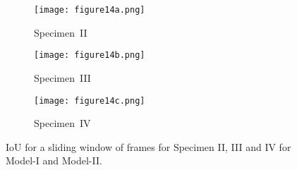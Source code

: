 \begin{sloppypar}
	\begin{figure}[!ht]
		\centering
		\begin{subfigure}[b]{0.8\textwidth}
			\centering
			\texttt{[image: figure14a.png]}
			\caption{Specimen~II}
			\label{fig:L3_S2_B_333x333p_50kHz_5HC_IoU}
		\end{subfigure}
		\par\medskip
		\begin{subfigure}[b]{0.8\textwidth}
			\centering
			\texttt{[image: figure14b.png]}
			\caption{Specimen~III} 
			\label{fig:L3_S3_B_333x333p_50kHz_5HC_shapes_}
		\end{subfigure}
		\par\medskip
		\begin{subfigure}[b]{0.8\textwidth}
			\centering
			\texttt{[image: figure14c.png]}
			\caption{Specimen~IV} 
			\label{fig:L3_S4_B_333x333p_50kHz_5HC_shapes_}
		\end{subfigure}
		\caption{IoU for a sliding window of frames for Specimen II, III and IV for Model-I and Model-II.}
		\label{fig:L3_S234_B_333x333p_50kHz_5HC_IoU_centre_window}
	\end{figure} 

	

\end{sloppypar}
